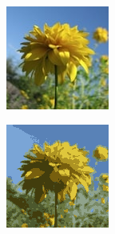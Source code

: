 \begin{figure}[htbp]
    \centering
    \caption{
        Case study: \texttt{flower-23.jpg}, $k=10$.
        Original image, reconstructed image using k-means, reconstruction error,
        and clusterings in sample space.
    }
    \begin{subfigure}[t]{0.32\textwidth}
        \includegraphics[width=\linewidth]{../../rust_code/data/kmeans/flower-23.jpg}
    \end{subfigure}
    \begin{subfigure}[t]{0.32\textwidth}
        \includegraphics[width=\linewidth]{../../python_code/plots/kmeans/flower-23/reconstruction.png}

\end{subfigure}
\end{figure}
